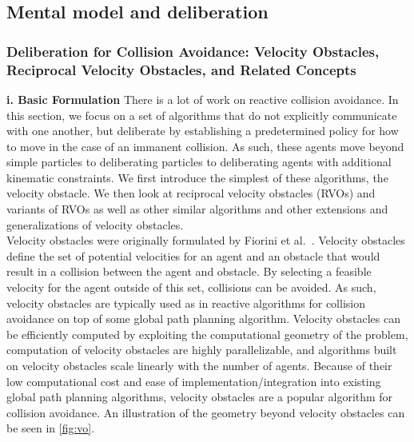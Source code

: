 \documentclass[tog]{acmsiggraph}
\begin{document}


%

\subsection{Mental model and deliberation}

\subsubsection{Deliberation for Collision Avoidance: Velocity Obstacles, Reciprocal Velocity Obstacles, and Related Concepts}
\textbf{i. Basic Formulation}
There is a lot of work on reactive collision avoidance. In this section, we focus on a set of algorithms that do not explicitly communicate with one another, but deliberate by establishing a predetermined policy for how to move in the case of an immanent collision. As such, these agents move beyond simple particles to deliberating particles to deliberating agents with additional kinematic constraints. We first introduce the simplest of these algorithms, the velocity obstacle. We then look at reciprocal velocity obstacles (RVOs) and variants of RVOs as well as other similar algorithms and other extensions and generalizations of velocity obstacles.
\\
Velocity obstacles were originally formulated by Fiorini et al.\ \cite{fiorini1998motion}. Velocity obstacles define the set of potential velocities for an agent and an obstacle that would result in a collision between the agent and obstacle. By selecting a feasible velocity for the agent outside of this set, collisions can be avoided. As such, velocity obstacles are typically used as in reactive algorithms for collision avoidance on top of some global path planning algorithm. Velocity obstacles can be efficiently computed by exploiting the computational geometry of the problem, computation of velocity obstacles are highly parallelizable, and algorithms built on velocity obstacles scale linearly with the number of agents. Because of their low computational cost and ease of implementation/integration into existing global path planning algorithms, velocity obstacles are a popular algorithm for collision avoidance. An illustration of the geometry beyond velocity obstacles can be seen in \ref{fig:vo}.
\end{document}
